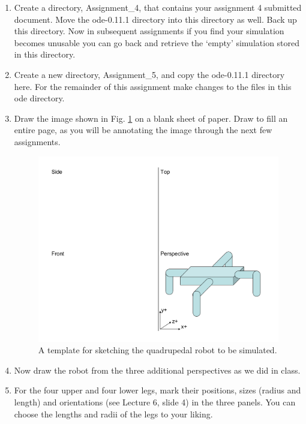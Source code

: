 \documentclass[12pt]{article}
\begin{document}
\begin{enumerate}

\item Create a directory, Assignment\_4, that contains your assignment 4 submitted document. Move the ode-0.11.1 directory into this directory as well. Back up this directory. Now in subsequent assignments if you find your simulation becomes unusable you can go back and retrieve the `empty' simulation stored in this directory.

\item Create a new directory, Assignment\_5, and copy the ode-0.11.1 directory here. For the remainder of this assignment make changes to the files in this ode directory.

\item Draw the image shown in Fig. \ref{Fig1} on a blank sheet of paper. Draw to fill an entire page, as you will be annotating the image through the next few assignments.

\begin{figure}[!t]
\centerline{
\includegraphics[width=1.0\textwidth]{Robot_Schematic.pdf}
}
\caption{A template for sketching the quadrupedal robot to be simulated.}
\label{Fig1}
\end{figure}

\item Now draw the robot from the three additional perspectives as we did in class.

\item For the four upper and four lower legs, mark their positions, sizes (radius and length) and orientations (see Lecture 6, slide 4) in the three panels. You can choose the lengths and radii of the legs to your liking.


\end{enumerate}
\end{document}
